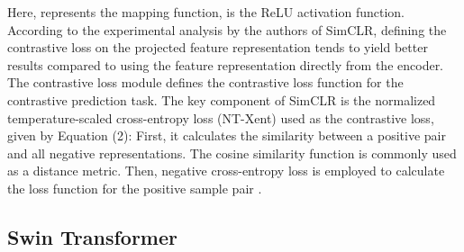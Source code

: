 \documentclass[10pt,twocolumn,letterpaper]{article}
\begin{document}
Here,  represents the mapping function,  is the ReLU activation function. According to the experimental analysis by the authors of SimCLR, defining the contrastive loss on the projected feature representation  tends to yield better results compared to using the feature representation  directly from the encoder.
The contrastive loss module defines the contrastive loss function for the contrastive prediction task. The key component of SimCLR is the normalized temperature-scaled cross-entropy loss (NT-Xent) used as the contrastive loss, given by Equation (2):
First, it calculates the similarity between a positive pair and all negative representations. The cosine similarity function is commonly used as a distance metric. Then, negative cross-entropy loss is employed to calculate the loss function for the positive sample pair .



\subsection{Swin Transformer}
\end{document}
